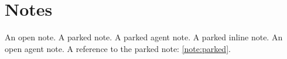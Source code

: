 \documentclass{article}
\begin{document}
\section{Notes}
An open note.
A parked note.
A parked agent note.
A parked inline note.
An open agent note.
A reference to the parked note: \cref{note:parked}.
\end{document}
